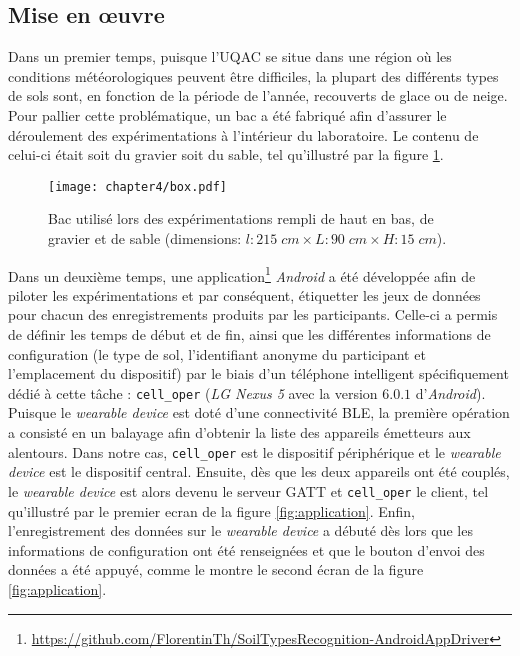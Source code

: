 \subsection{Mise en \oe{}uvre}

Dans un premier temps, puisque l'\acs{UQAC} se situe dans une région où les conditions météorologiques peuvent être difficiles, la plupart des différents types de sols sont, en fonction de la période de l'année, recouverts de glace ou de neige. Pour pallier cette problématique, un bac a été fabriqué afin d'assurer le déroulement des expérimentations à l'intérieur du laboratoire. Le contenu de celui-ci était soit du gravier soit du sable, tel qu'illustré par la figure \ref{fig:box}.

\begin{figure}[H]
	\centering
	\texttt{[image: chapter4/box.pdf]}
        \caption{Bac utilisé lors des expérimentations rempli de haut en bas, de gravier et de sable (dimensions: $l : 215\; cm \times L : 90\; cm \times H : 15\; cm$).}
	\label{fig:box}
\end{figure}

Dans un deuxième temps, une application\footnote{\url{https://github.com/FlorentinTh/SoilTypesRecognition-AndroidAppDriver}} \textit{Android} a été développée afin de piloter les expérimentations et par conséquent, étiquetter les jeux de données pour chacun des enregistrements produits par les participants. Celle-ci a permis de définir les temps de début et de fin, ainsi que les différentes informations de configuration (le type de sol, l'identifiant anonyme du participant et l'emplacement du dispositif) par le biais d'un téléphone intelligent spécifiquement dédié à cette tâche : \texttt{cell\_oper} (\textit{LG Nexus 5} avec la version $6.0.1$ d'\textit{Android}). Puisque le \textit{wearable device} est doté d'une connectivité \acs{BLE}, la première opération a consisté en un balayage afin d'obtenir la liste des appareils émetteurs aux alentours. Dans notre cas, \texttt{cell\_oper} est le dispositif périphérique et le \textit{wearable device} est le dispositif central. Ensuite, dès que les deux appareils ont été couplés, le \textit{wearable device} est alors devenu le serveur \acs{GATT} et \texttt{cell\_oper} le client, tel qu'illustré par le premier ecran de la figure \ref{fig:application}. Enfin, l'enregistrement des données sur le \textit{wearable device} a débuté dès lors que les informations de configuration ont été renseignées et que le bouton d'envoi des données a été appuyé, comme le montre le second écran de la figure \ref{fig:application}.

